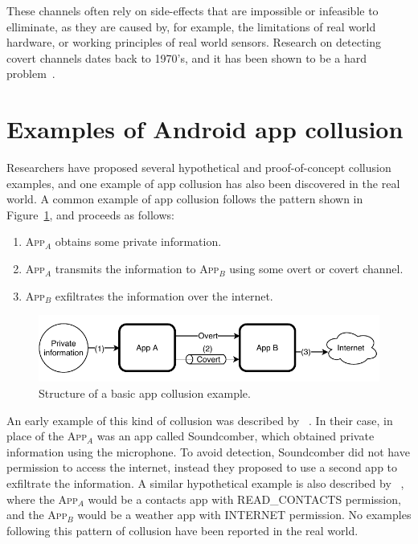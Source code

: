 \documentclass[article]{aaltoseries}
\newcommand{\Fref}[1]{Figure~\ref{#1}}
\newcommand{\app}[1]{A\textsc{pp}$_{#1}$\xspace}
\begin{document}
These channels often rely on side-effects that are impossible or infeasible to elliminate, as they are caused by, for example, the limitations of real world hardware, or working principles of real world sensors. Research on detecting covert channels dates back to 1970's, and it has been shown to be a hard problem~\cite{Marforio2012}.

\section{Examples of Android app collusion}
\label{sec:examples}

Researchers have proposed several hypothetical and proof-of-concept collusion examples, and one example of app collusion has also been discovered in the real world. A common example of app collusion follows the pattern shown in \Fref{fig:sample}, and proceeds as follows:
\begin{enumerate}[nosep,label={(\arabic*)}]
	\item \app{A} obtains some private information.
	\item \app{A} transmits the information to \app{B} using some overt or covert channel.
	\item \app{B} exfiltrates the information over the internet.
\end{enumerate}

\begin{figure}[ht]
	\centering
	\includegraphics[width=1.0\textwidth]{figures/Collusion1}
	\caption{Structure of a basic app collusion example.}
	\label{fig:sample}
\end{figure}

An early example of this kind of collusion was described by \citeauthor{Schlegel2011}~\cite{Schlegel2011}. In their case, in place of the \app{A} was an app called Soundcomber, which obtained private information using the microphone. To avoid detection, Soundcomber did not have permission to access the internet, instead they proposed to use a second app to exfiltrate the information. A similar hypothetical example is also described by \citeauthor{Asavoae2017}~\cite{Asavoae2017}, where the \app{A} would be a contacts app with READ\_CONTACTS permission, and the \app{B} would be a weather app with INTERNET permission. No examples following this pattern of collusion have been reported in the real world.
\end{document}
